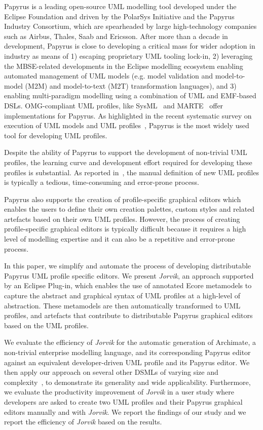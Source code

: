 Papyrus \cite{lanusse2009papyrus} is a leading open-source UML modelling tool developed under the Eclipse Foundation and driven by the PolarSys Initiative and the Papyrus Industry Consortium, which are spearheaded by large high-technology companies such as Airbus, Thales, Saab and Ericsson. 
After more than a decade in development, Papyrus is close to developing a critical mass for wider adoption in industry as means of 1) escaping proprietary UML tooling lock-in, 2) leveraging the MBSE-related developments in the Eclipse modelling ecosystem enabling automated management of UML models (e.g. model validation and model-to-model (M2M) and model-to-text (M2T) transformation languages), and 3) enabling multi-paradigm modelling using a combination of UML and EMF-based DSLs. 
OMG-compliant UML profiles, like SysML~\cite{friedenthal2014practical} and MARTE~\cite{omg2011marte} offer implementations for Papyrus. 
As highlighted in the recent systematic survey on execution of UML models and UML profiles~\cite{ciccozzi2018execution}, Papyrus is the most widely used tool for developing UML profiles. 

Despite the ability of Papyrus to support the development of non-trivial UML profiles, the learning curve and development effort required for developing these profiles is substantial.
As reported in~\cite{Wimmer2009:IJWIS}, the manual definition of new UML profiles is typically a tedious, time-consuming and error-prone process.

Papyrus also supports the creation of profile-specific graphical editors which enables the users to define their own creation palettes, custom styles and related artefacts based on their own UML profiles. 
However, the process of creating profile-specific graphical editors is typically difficult because it requires a high level of modelling expertise and it can also be a repetitive and error-prone process.

In this paper, we simplify and automate the process of developing distributable Papyrus UML profile specific editors. 
We present \textit{Jorvik}, an approach supported by an Eclipse Plug-in, which enables the use of annotated Ecore metamodels to capture the abstract and graphical syntax of UML profiles at a high-level of abstraction. These metamodels are then automatically transformed to UML profiles, and artefacts that contribute to distributable Papyrus graphical editors based on the UML profiles. 


We evaluate the efficiency of \textit{Jorvik} for the automatic generation of Archimate, a non-trivial enterprise modelling language, and its corresponding Papyrus editor against an equivalent developer-driven UML profile and its Papyrus editor. 
We then apply our approach on several other DSMLs of varying size and complexity~\cite{williams2013metamodels}, to demonstrate its generality and wide applicability. 
Furthermore, we evaluate the productivity improvement of \textit{Jorvik} in a user study where developers are asked to create two UML profiles and their Papyrus graphical editors manually and with \textit{Jorvik}.
We report the findings of our study and we report the efficiency of \textit{Jorvik} based on the results. 

